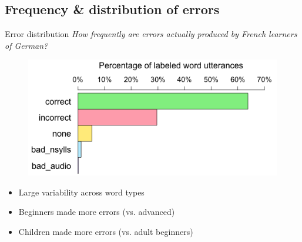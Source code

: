 \documentclass[xcolor={dvipsnames}]{beamer}
\begin{document}
	\subsection{Frequency \& distribution of errors}
		\begin{frame}{Error distribution}
		\textit{How frequently are  errors actually produced by French learners of German?}
		
		\pause
		
		
		
		\begin{figure}
			\centering
			\includegraphics[width=.8\textwidth]{overallJudgments-axisTop-noLabels}

			\label{fig:results:overallbars}
		\end{figure}
		\pause
		\begin{itemize}
		\item Large variability across word types %
		\item Beginners made more errors (vs. advanced)
		\item Children made more errors (vs. adult beginners)
		\end{itemize}
		\end{frame}
		
\end{document}
